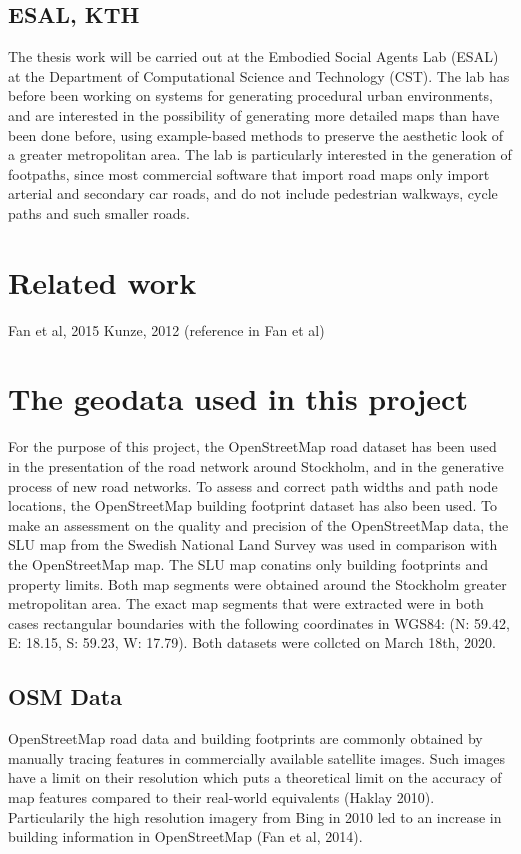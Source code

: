 \documentclass[a4paper]{article}
\begin{document}
\subsection{ESAL, KTH}
The thesis work will be carried out at the Embodied Social Agents Lab (ESAL) at the Department of Computational Science and Technology (CST). The lab has before been working on systems for generating procedural urban environments, and are interested in the possibility of generating more detailed maps than have been done before, using example-based methods to preserve the aesthetic look of a greater metropolitan area. The lab is particularly interested in the generation of footpaths, since most commercial software that import road maps only import arterial and secondary car roads, and do not include pedestrian walkways, cycle paths and such smaller roads.

\section{Related work}
Fan et al, 2015
Kunze, 2012 (reference in Fan et al)


\section{The geodata used in this project}

For the purpose of this project, the OpenStreetMap road dataset has been used in the presentation of the road network around Stockholm, and in the generative process of new road networks. To assess and correct path widths and path node locations, the OpenStreetMap building footprint dataset has also been used. To make an assessment on the quality and precision of the OpenStreetMap data, the SLU map from the Swedish National Land Survey was used in comparison with the OpenStreetMap map. The SLU map conatins only building footprints and property limits. Both map segments were obtained around the Stockholm greater metropolitan area.
The exact map segments that were extracted were in both cases rectangular boundaries with the following coordinates in WGS84: (N: 59.42, E: 18.15, S: 59.23, W: 17.79).
Both datasets were collcted on March 18th, 2020.

\subsection{OSM Data}

OpenStreetMap road data and building footprints are commonly obtained by manually tracing features in commercially available satellite images. Such images have a limit on their resolution which puts a theoretical limit on the accuracy of map features compared to their real-world equivalents (Haklay 2010). Particularily the high resolution imagery from Bing in 2010 led to an increase in building information in OpenStreetMap (Fan et al, 2014).
\end{document}
